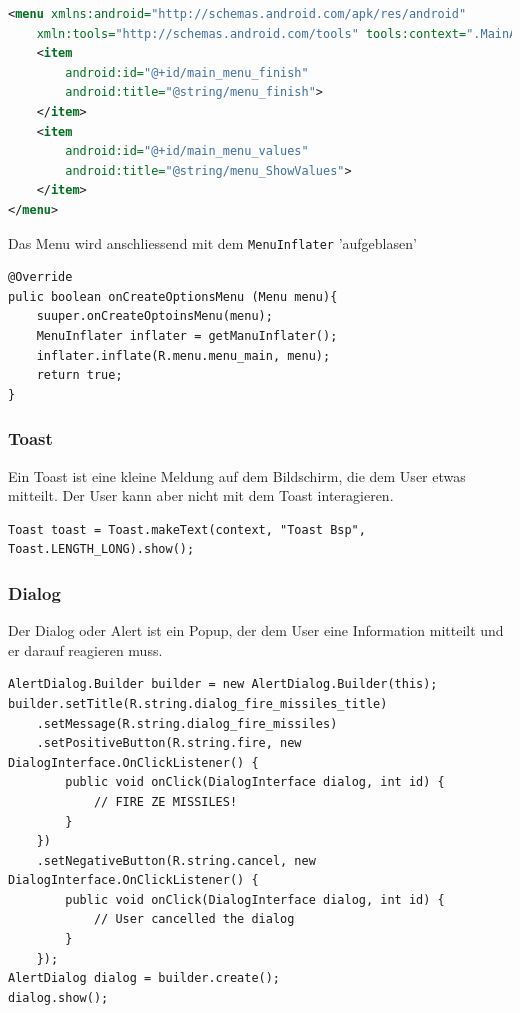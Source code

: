 \documentclass[a4paper, 11pt]{article}
\newcommand{\code}[1]{\texttt{#1}}
\begin{document}
\begin{lstlisting}[language=xml, captionpos=b, caption={Beispiel eines Menu Layouts}]
<menu xmlns:android="http://schemas.android.com/apk/res/android"
	xmln:tools="http://schemas.android.com/tools" tools:context=".MainActivity">
	<item
		android:id="@+id/main_menu_finish"
		android:title="@string/menu_finish">
	</item>
	<item
		android:id="@+id/main_menu_values"
		android:title="@string/menu_ShowValues">
	</item>
</menu>
\end{lstlisting}

Das Menu wird anschliessend mit dem \code{MenuInflater} 'aufgeblasen'

\begin{lstlisting}[captionpos=b, caption={Beispiel des Menu-Inflators}]
@Override
pulic boolean onCreateOptionsMenu (Menu menu){
	suuper.onCreateOptoinsMenu(menu);
	MenuInflater inflater = getManuInflater();
	inflater.inflate(R.menu.menu_main, menu);
	return true;
}
\end{lstlisting}

\subsubsection{Toast}
Ein Toast ist eine kleine Meldung auf dem Bildschirm, die dem User etwas mitteilt. Der User kann aber nicht mit dem Toast interagieren.

\begin{lstlisting}[caption={Toast-Beispiel}]
Toast toast = Toast.makeText(context, "Toast Bsp", Toast.LENGTH_LONG).show();
\end{lstlisting}

\subsubsection{Dialog}
Der Dialog oder Alert ist ein Popup, der dem User eine Information mitteilt und er darauf reagieren muss.

\begin{lstlisting}[caption={Alert-Beispiel}]
AlertDialog.Builder builder = new AlertDialog.Builder(this);
builder.setTitle(R.string.dialog_fire_missiles_title)
	.setMessage(R.string.dialog_fire_missiles)
	.setPositiveButton(R.string.fire, new DialogInterface.OnClickListener() {
		public void onClick(DialogInterface dialog, int id) {
			// FIRE ZE MISSILES!
		}
	})
	.setNegativeButton(R.string.cancel, new DialogInterface.OnClickListener() {
		public void onClick(DialogInterface dialog, int id) {
			// User cancelled the dialog
		}
	});
AlertDialog dialog = builder.create();
dialog.show();
\end{lstlisting}
\end{document}
